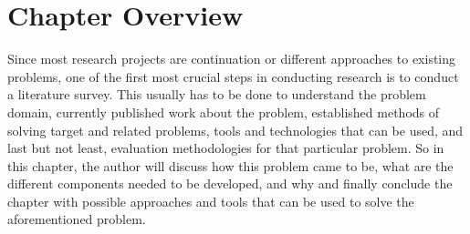 \section{Chapter Overview}

Since most research projects are continuation or different approaches to existing problems, one of the first most crucial steps in conducting research is to conduct a literature survey. This usually has to be done to understand the problem domain, currently published work about the problem, established methods of solving target and related problems, tools and technologies that can be used, and last but not least, evaluation methodologies for that particular problem. So in this chapter, the author will discuss how this problem came to be, what are the different components needed to be developed, and why and finally conclude the chapter with possible approaches and tools that can be used to solve the aforementioned problem. 

